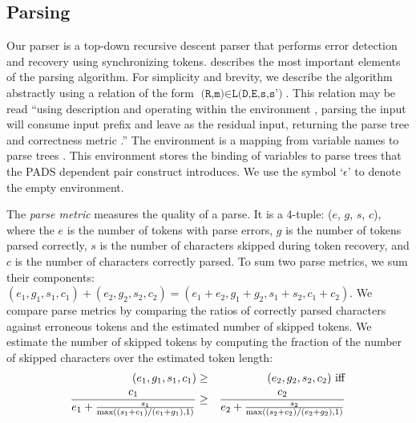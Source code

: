 

\subsection{Parsing}
\label{sec:parse}
Our parser is a top-down recursive descent parser
that performs error detection and recovery using synchronizing tokens.
 describes the most important elements
of the parsing algorithm.  For simplicity and brevity, we
describe the algorithm abstractly
using a relation of the form 
${\texttt{(R,m)} \in \texttt{L(D,E,s,s')}}$.  This relation may be
read ``using description  and operating within the environment ,
parsing the input  will consume input prefix  and leave  as the residual input, 
returning the parse tree  and correctness metric .''   
The environment  is a mapping from variable names
 to parse trees .  This environment stores the
binding of variables to parse trees that the PADS dependent
pair construct introduces.   We use the symbol `$\epsilon$' to denote the empty environment.

The {\em parse metric}  measures the quality of a parse. It is a 
4-tuple: ($e$, $g$, $s$, $c$), where the $e$ is the number of tokens
with parse errors, $g$ is the number of tokens parsed correctly,
$s$ is the number of 
characters skipped during  token recovery, 
and $c$ is the number of characters correctly parsed. 
To sum two parse metrics, we sum their components:
$(e_1, g_1, s_1, c_1) + (e_2, g_2, s_2, c_2) = 
(e_1 + e_2, g_1 + g_2, s_1 + s_2, c_1 + c_2)$.
We compare parse metrics by comparing the ratios of correctly
parsed characters against erroneous tokens and the estimated number of
skipped tokens.  We estimate the number of skipped tokens
by computing the
fraction of the number of skipped characters over the estimated token
length:
\begin{eqnarray*}
(e_1, g_1, s_1, c_1) &\ge& (e_2, g_2, s_2, c_2)~ \rm{iff} \\
\frac{c_1}{e_1+\frac{s_1}{\max((s_1+c_1)/(e_1+g_1), 1)}} &\ge& 
\frac{c_2}{e_2+\frac{s_2}{\max((s_2+c_2)/(e_2+g_2), 1)}} \\
\end{eqnarray*}

